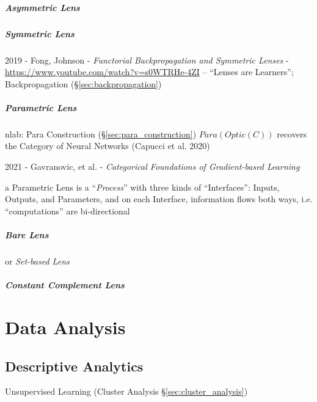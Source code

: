 \subparagraph{Asymmetric Lens}\label{sec:asymmetric_lens}\hfill

\subparagraph{Symmetric Lens}\label{sec:symmetric_lens}\hfill

2019 - Fong, Johnson - \emph{Functorial Backpropagation and Symmetric Lenses} -
\url{https://www.youtube.com/watch?v=s0WTRHe-4ZI} -- ``Lenses are Learners'';
\fist Backpropagation (\S\ref{sec:backpropagation})



\subparagraph{Parametric Lens}\label{sec:parametric_lens}\hfill


nlab: Para Construction (\S\ref{sec:para_construction}) $Para(Optic(C))$
recovers the Category of Neural Networks (Capucci et al. 2020)

2021 - Gavranovic, et al. - \emph{Categorical Foundations of Gradient-based
Learning}

a Parametric Lens is a ``\emph{Process}'' with three kinds of ``Interfaces'':
Inputs, Outputs, and Parameters, and on each Interface, information flows both
ways, i.e. ``computations'' are bi-directional



\subparagraph{Bare Lens}\label{sec:bare_lens}\hfill

or \emph{Set-based Lens}



\subparagraph{Constant Complement Lens}
\label{sec:constant_complement_lens}\hfill



\section{Data Analysis}\label{sec:data_analysis}

\subsection{Descriptive Analytics}\label{sec:descriptive_analytics}

\fist Unsupervised Learning (Cluster Analysis \S\ref{sec:cluster_analysis})



